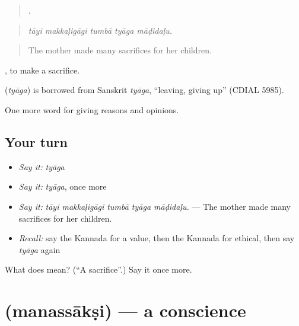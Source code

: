 \begin{quote}
    .
\end{quote}

\begin{quote}
\emph{tāyi makkaḷigāgi tumbā tyāga māḍidaḷu.}
\end{quote}

\begin{quote}
The mother made many sacrifices for her children.
\end{quote}

 , to make a sacrifice.

\begin{cousinweb}
\textbf{} (\emph{tyāga}) is borrowed from Sanskrit \emph{tyāga}, \textquotedblleft{}leaving, giving up\textquotedblright{} (CDIAL 5985).
\end{cousinweb}

\begin{grammarlens}[title={What you've built}]
One more word for giving reasons and opinions.
\end{grammarlens}

\subsection*{Your turn}
\begin{itemize}
\raggedright
  \item \emph{Say it:} \emph{tyāga}
  \item \emph{Say it:} \emph{tyāga}, once more
  \item \emph{Say it:} \emph{tāyi makkaḷigāgi tumbā tyāga māḍidaḷu.} — The mother made many sacrifices for her children.
  \item \emph{Recall:} say the Kannada for a value, then the Kannada for ethical, then say \emph{tyāga} again
\end{itemize}

\begin{tcolorbox}[breakable,colback=teal!4,colframe=teal!35!black,title={Before you move on}]
What does  mean? (\textquotedblleft{}A sacrifice\textquotedblright{}.) Say it once more.
\end{tcolorbox}
\section[\texorpdfstring{\kn{ಮನಸ್ಸಾಕ್ಷಿ} (manassākṣi)}{ಮನಸ್ಸಾಕ್ಷಿ (manassākṣi)}]{ (manassākṣi) — a conscience}

